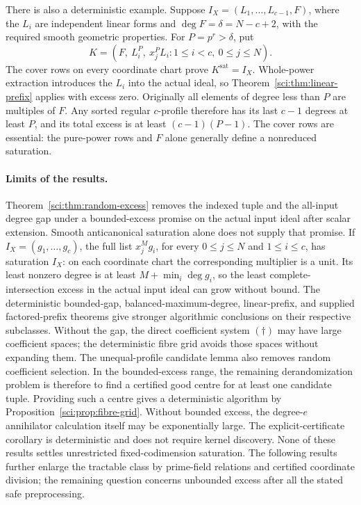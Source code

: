 There is also a deterministic example. Suppose
\(I_X=(L_1,\ldots,L_{c-1},F)\), where the \(L_i\) are independent
linear forms and \(\deg F=\delta=N-c+2\), with the required
smooth geometric properties. For \(P=p^r>\delta\), put
\[
 K=(F,\ L_i^P,\ x_j^P L_i:
          1\leq i<c,\ 0\leq j\leq N).
\]
The cover rows on every coordinate chart prove \(K^{\mathrm{sat}}=I_X\).
Whole-power extraction introduces the \(L_i\) into the actual ideal,
so Theorem~\ref{sci:thm:linear-prefix} applies with excess zero.
Originally all elements of degree less than \(P\) are multiples of
\(F\). Any sorted regular \(c\)-profile therefore has its last
\(c-1\) degrees at least \(P\), and its total excess is at least
\((c-1)(P-1)\). The cover rows are essential: the pure-power rows
and \(F\) alone generally define a nonreduced saturation.

\paragraph{Limits of the results.}
Theorem~\ref{sci:thm:random-excess} removes the indexed tuple and the
all-input degree gap under a bounded-excess promise on the actual
input ideal after scalar extension. Smooth anticanonical saturation
alone does not supply that promise. If \(I_X=(g_1,\ldots,g_c)\), the
full list \(x_j^M g_i\), for every \(0\leq j\leq N\) and
\(1\leq i\leq c\), has saturation \(I_X\): on each coordinate
chart the corresponding multiplier is a unit. Its least nonzero degree
is at least \(M+\min_i\deg g_i\), so the least complete-intersection
excess in the actual input ideal can grow without bound.
The deterministic bounded-gap, balanced-maximum-degree, linear-prefix,
and supplied factored-prefix theorems give stronger algorithmic
conclusions on their respective subclasses. Without the gap, the direct coefficient system
\((\dagger)\) may have large coefficient spaces; the deterministic
fibre grid avoids those spaces without expanding them. The unequal-profile
candidate lemma also removes random coefficient selection. In the
bounded-excess range, the remaining derandomization problem is therefore
to find a certified good centre for at least one candidate tuple.
Providing such a centre gives a deterministic algorithm by
Proposition~\ref{sci:prop:fibre-grid}. Without bounded
excess, the degree-\(e\) annihilator calculation itself may be
exponentially large. The explicit-certificate corollary is deterministic
and does not require kernel discovery. None of these results settles
unrestricted fixed-codimension saturation. The following results further
enlarge the tractable class by prime-field relations and certified
coordinate division; the
remaining question concerns unbounded excess after all the stated
safe preprocessing.
